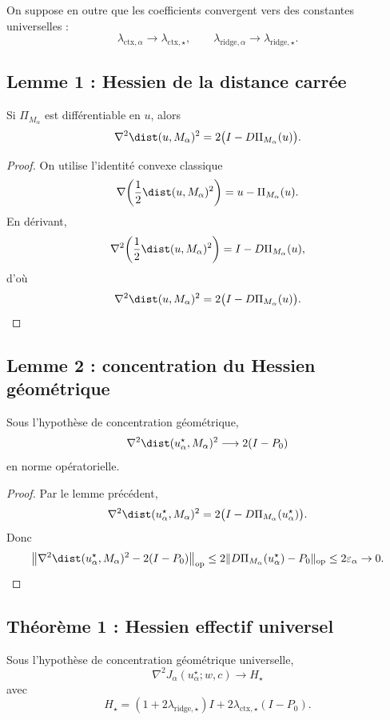 On suppose en outre que les coefficients convergent vers des constantes universelles :
\[
\lambda_{\mathrm{ctx},\alpha}\to \lambda_{\mathrm{ctx},\star},
\qquad
\lambda_{\mathrm{ridge},\alpha}\to \lambda_{\mathrm{ridge},\star}.
\]

\subsection{Lemme 1 : Hessien de la distance carrée}

\begin{lemma}
Si \(\Pi_{M_\alpha}\) est différentiable en \(u\), alors
\[
\nabla^2 \dist(u,M_\alpha)^2
=
2\bigl(I-D\Pi_{M_\alpha}(u)\bigr).
\]
\end{lemma}

\begin{proof}
On utilise l'identité convexe classique
\[
\nabla\!\left(\frac12\dist(u,M_\alpha)^2\right)=u-\Pi_{M_\alpha}(u).
\]
En dérivant,
\[
\nabla^2\!\left(\frac12\dist(u,M_\alpha)^2\right)
=
I-D\Pi_{M_\alpha}(u),
\]
d'où
\[
\nabla^2\dist(u,M_\alpha)^2
=
2\bigl(I-D\Pi_{M_\alpha}(u)\bigr).
\]
\end{proof}

\subsection{Lemme 2 : concentration du Hessien géométrique}

\begin{lemma}
Sous l'hypothèse de concentration géométrique,
\[
\nabla^2 \dist(u_\alpha^\star,M_\alpha)^2
\longrightarrow
2(I-P_0)
\]
en norme opératorielle.
\end{lemma}

\begin{proof}
Par le lemme précédent,
\[
\nabla^2 \dist(u_\alpha^\star,M_\alpha)^2
=
2\bigl(I-D\Pi_{M_\alpha}(u_\alpha^\star)\bigr).
\]
Donc
\[
\left\|
\nabla^2 \dist(u_\alpha^\star,M_\alpha)^2
-
2(I-P_0)
\right\|_{\mathrm{op}}
\le
2\|D\Pi_{M_\alpha}(u_\alpha^\star)-P_0\|_{\mathrm{op}}
\le
2\varepsilon_\alpha\to 0.
\]
\end{proof}

\subsection{Théorème 1 : Hessien effectif universel}

\begin{theorem}
Sous l'hypothèse de concentration géométrique universelle,
\[
\nabla^2 J_\alpha(u_\alpha^\star;w,c)
\longrightarrow
H_\star
\]
avec
\[
H_\star
=
(1+2\lambda_{\mathrm{ridge},\star})I
+
2\lambda_{\mathrm{ctx},\star}(I-P_0).
\]
\end{theorem}

